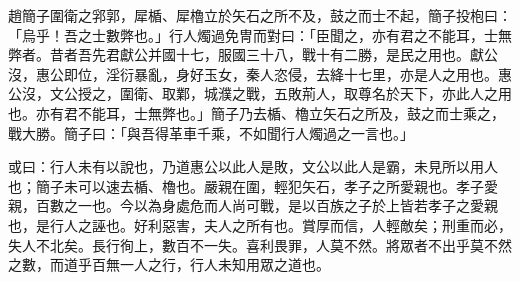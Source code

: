 \begin{pinyinscope}
趙簡子圍衛之郛郭，犀楯、犀櫓立於矢石之所不及，鼓之而士不起，簡子投枹曰：「烏乎！吾之士數弊也。」行人燭過免冑而對曰：「臣聞之，亦有君之不能耳，士無弊者。昔者吾先君獻公并國十七，服國三十八，戰十有二勝，是民之用也。獻公沒，惠公即位，淫衍暴亂，身好玉女，秦人恣侵，去絳十七里，亦是人之用也。惠公沒，文公授之，圍衛、取鄴，城濮之戰，五敗荊人，取尊名於天下，亦此人之用也。亦有君不能耳，士無弊也。」簡子乃去楯、櫓立矢石之所及，鼓之而士乘之，戰大勝。簡子曰：「與吾得革車千乘，不如聞行人燭過之一言也。」

或曰：行人未有以說也，乃道惠公以此人是敗，文公以此人是霸，未見所以用人也；簡子未可以速去楯、櫓也。嚴親在圍，輕犯矢石，孝子之所愛親也。孝子愛親，百數之一也。今以為身處危而人尚可戰，是以百族之子於上皆若孝子之愛親也，是行人之誣也。好利惡害，夫人之所有也。賞厚而信，人輕敵矣；刑重而必，失人不北矣。長行徇上，數百不一失。喜利畏罪，人莫不然。將眾者不出乎莫不然之數，而道乎百無一人之行，行人未知用眾之道也。


\end{pinyinscope}